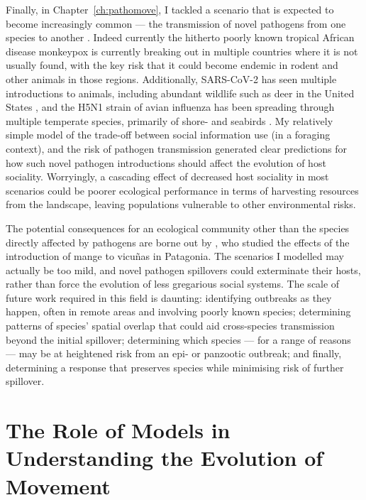 Finally, in Chapter~\ref{ch:pathomove}, I tackled a scenario that is expected to become increasingly common --- the transmission of novel pathogens from one species to another \citep{carlson2022a}.
Indeed currently the hitherto poorly known tropical African disease monkeypox is currently breaking out in multiple countries where it is not usually found, with the key risk that it could become endemic in rodent and other animals in those regions.
Additionally, SARS-CoV-2 has seen multiple introductions to animals, including abundant wildlife such as deer in the United States \citep{kuchipudi2022}, and the H5N1 strain of avian influenza has been spreading through multiple temperate species, primarily of shore- and seabirds \citep{wille2022}.
My relatively simple model of the trade-off between social information use (in a foraging context), and the risk of pathogen transmission generated clear predictions for how such novel pathogen introductions should affect the evolution of host sociality.
Worryingly, a cascading effect of decreased host sociality in most scenarios could be poorer ecological performance in terms of harvesting resources from the landscape, leaving populations vulnerable to other environmental risks.

The potential consequences for an ecological community other than the species directly affected by pathogens are borne out by \citet{monk2022}, who studied the effects of the introduction of mange to vicu\~{n}as in Patagonia.
The scenarios I modelled may actually be too mild, and novel pathogen spillovers could exterminate their hosts, rather than force the evolution of less gregarious social systems.
The scale of future work required in this field is daunting: identifying outbreaks as they happen, often in remote areas and involving poorly known species; determining patterns of species' spatial overlap that could aid cross-species transmission beyond the initial spillover; determining which species --- for a range of reasons --- may be at heightened risk from an epi- or panzootic outbreak; and finally, determining a response that preserves species while minimising risk of further spillover.

\section*{The Role of Models in Understanding the Evolution of Movement}

